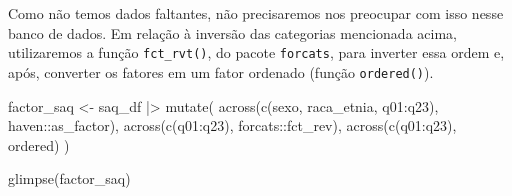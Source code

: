\documentclass[
  letterpaper,
  DIV=11,
  numbers=noendperiod]{scrartcl}
\newenvironment{Shaded}{\begin{snugshade}}{\end{snugshade}}
\newcommand{\FunctionTok}[1]{\textcolor[rgb]{0.28,0.35,0.67}{#1}}
\newcommand{\NormalTok}[1]{\textcolor[rgb]{0.00,0.23,0.31}{#1}}
\newcommand{\OtherTok}[1]{\textcolor[rgb]{0.00,0.23,0.31}{#1}}
\newcommand{\SpecialCharTok}[1]{\textcolor[rgb]{0.37,0.37,0.37}{#1}}
\begin{document}
Como não temos dados faltantes, não precisaremos nos preocupar com isso
nesse banco de dados. Em relação à inversão das categorias mencionada
acima, utilizaremos a função \texttt{fct\_rvt()}, do pacote
\texttt{forcats}, para inverter essa ordem e, após, converter os fatores
em um fator ordenado (função \texttt{ordered()}).

\begin{Shaded}
\begin{Highlighting}[]
\NormalTok{factor\_saq }\OtherTok{\textless{}{-}}\NormalTok{ saq\_df }\SpecialCharTok{|\textgreater{}} 
  \FunctionTok{mutate}\NormalTok{(}
    \FunctionTok{across}\NormalTok{(}\FunctionTok{c}\NormalTok{(sexo, raca\_etnia, q01}\SpecialCharTok{:}\NormalTok{q23), haven}\SpecialCharTok{::}\NormalTok{as\_factor), }
    \FunctionTok{across}\NormalTok{(}\FunctionTok{c}\NormalTok{(q01}\SpecialCharTok{:}\NormalTok{q23), forcats}\SpecialCharTok{::}\NormalTok{fct\_rev),}
    \FunctionTok{across}\NormalTok{(}\FunctionTok{c}\NormalTok{(q01}\SpecialCharTok{:}\NormalTok{q23), ordered)}
\NormalTok{  ) }

\FunctionTok{glimpse}\NormalTok{(factor\_saq)}
\end{Highlighting}
\end{Shaded}
\end{document}
